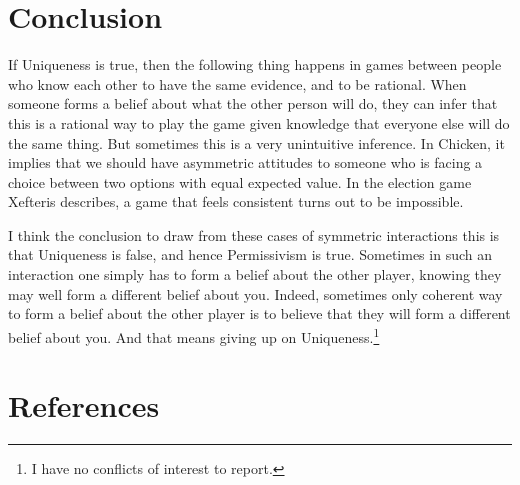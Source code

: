 \documentclass[
  11pt,
]{article}
\begin{document}
\section{Conclusion}\label{conclusion}

If Uniqueness is true, then the following thing happens in games between people who know each other to have the same evidence, and to be rational. When someone forms a belief about what the other person will do, they can infer that this is a rational way to play the game given knowledge that everyone else will do the same thing. But sometimes this is a very unintuitive inference. In Chicken, it implies that we should have asymmetric attitudes to someone who is facing a choice between two options with equal expected value. In the election game Xefteris describes, a game that feels consistent turns out to be impossible.

I think the conclusion to draw from these cases of symmetric interactions this is that Uniqueness is false, and hence Permissivism is true. Sometimes in such an interaction one simply has to form a belief about the other player, knowing they may well form a different belief about you. Indeed, sometimes only coherent way to form a belief about the other player is to believe that they will form a different belief about you. And that means giving up on Uniqueness.\footnote{I have no conflicts of interest to report.}

\section*{References}\label{references}
\end{document}
